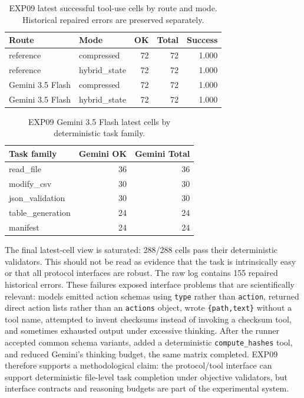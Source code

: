 \documentclass[11pt]{article}
\begin{document}
\begin{table}[ht]
\centering
\small
\begin{tabular}{llrrr}
\toprule
Route & Mode & OK & Total & Success \\
\midrule
reference & compressed & 72 & 72 & 1.000 \\
reference & hybrid\_state & 72 & 72 & 1.000 \\
Gemini 3.5 Flash & compressed & 72 & 72 & 1.000 \\
Gemini 3.5 Flash & hybrid\_state & 72 & 72 & 1.000 \\
\bottomrule
\end{tabular}
\caption{EXP09 latest successful tool-use cells by route and mode. Historical repaired errors are preserved separately.}
\label{tab:exp09_route_mode}
\end{table}

\begin{table}[ht]
\centering
\small
\begin{tabular}{lrr}
\toprule
Task family & Gemini OK & Gemini Total \\
\midrule
read\_file & 36 & 36 \\
modify\_csv & 30 & 30 \\
json\_validation & 30 & 30 \\
table\_generation & 24 & 24 \\
manifest & 24 & 24 \\
\bottomrule
\end{tabular}
\caption{EXP09 Gemini 3.5 Flash latest cells by deterministic task family.}
\label{tab:exp09_task_family}
\end{table}

The final latest-cell view is saturated: 288/288 cells pass their deterministic validators. This should not be read as evidence that the task is intrinsically easy or that all protocol interfaces are robust. The raw log contains 155 repaired historical errors. These failures exposed interface problems that are scientifically relevant: models emitted action schemas using \texttt{type} rather than \texttt{action}, returned direct action lists rather than an \texttt{actions} object, wrote \texttt{\{path,text\}} without a tool name, attempted to invent checksums instead of invoking a checksum tool, and sometimes exhausted output under excessive thinking. After the runner accepted common schema variants, added a deterministic \texttt{compute\_hashes} tool, and reduced Gemini's thinking budget, the same matrix completed. EXP09 therefore supports a methodological claim: the protocol/tool interface can support deterministic file-level task completion under objective validators, but interface contracts and reasoning budgets are part of the experimental system.
\end{document}
